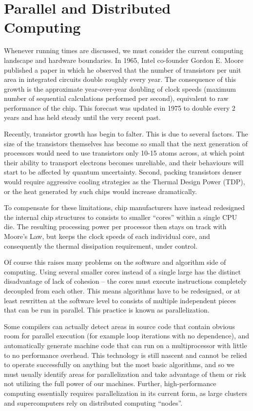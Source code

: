 \section{Parallel and Distributed Computing}

	Whenever running times are discussed, we must consider the current computing landscape and hardware boundaries. In 1965, Intel co-founder Gordon E. Moore published a paper in which he observed that the number of transistors per unit area in integrated circuits double roughly every year. The consequence of this growth is the approximate year-over-year doubling of clock speeds (maximum number of sequential calculations performed per second), equivalent to raw performance of the chip. This forecast was updated in 1975 to double every 2 years and has held steady until the very recent past.

	Recently, transistor growth has begin to falter. This is due to several factors. The size of the transistors themselves has become so small that the next generation of processors would need to use transistors only 10-15 atoms across, at which point their ability to transport electrons becomes unreliable, and their behaviours will start to be affected by quantum uncertainty. Second, packing transistors denser would require aggressive cooling strategies as the Thermal Design Power (TDP), or the heat generated by such chips would increase dramatically.

	To compensate for these limitations, chip manufacturers have instead redesigned the internal chip structures to consists to smaller ``cores'' within a single CPU die. The resulting processing power per processor then stays on track with Moore's Law, but keeps the clock speeds of each individual core, and consequently the thermal dissipation requirement, under control.

	Of course this raises many problems on the software and algorithm side of computing. Using several smaller cores instead of a single large has the distinct disadvantage of lack of cohesion -- the cores must execute instructions completely decoupled from each other. This means algorithms have to be redesigned, or at least rewritten at the software level to consists of multiple independent pieces that can be run in parallel. This practice is known as parallelization.

	Some compilers can actually detect areas in source code that contain obvious room for parallel execution (for example loop iterations with no dependence), and automatically generate machine code that can run on a multiprocessor with little to no performance overhead. This technology is still nascent and cannot be relied to operate successfully on anything but the most basic algorithms, and so we must usually identify areas for parallelization and take advantage of them or risk not utilizing the full power of our machines. Further, high-performance computing essentially requires parallelization in its current form, as large clusters and supercomputers rely on distributed computing ``nodes''.

